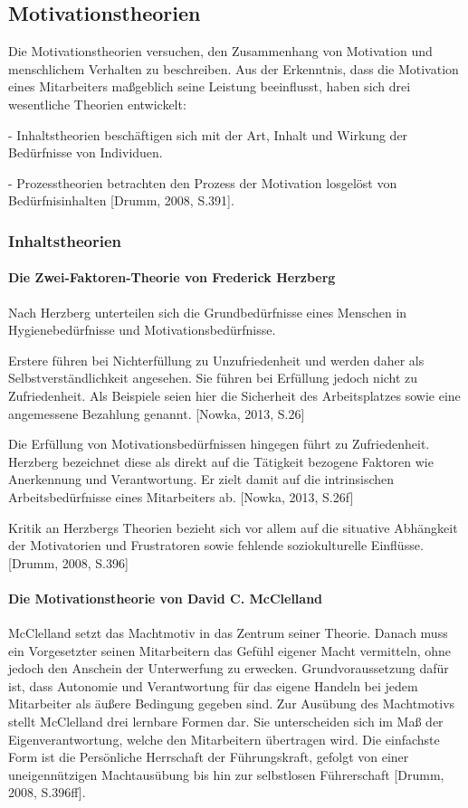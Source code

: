 \subsection{Motivationstheorien}
Die Motivationstheorien versuchen, den Zusammenhang von Motivation und menschlichem Verhalten zu beschreiben. Aus der Erkenntnis, dass die Motivation eines Mitarbeiters maßgeblich seine Leistung beeinflusst, haben sich drei wesentliche Theorien entwickelt:

- Inhaltstheorien beschäftigen sich mit \glqq der Art, Inhalt und Wirkung der Bedürfnisse von Individuen\grqq [Drumm, 2008, S.391].

- Prozesstheorien betrachten den Prozess der Motivation losgelöst von Bedürfnisinhalten [Drumm, 2008, S.391].

\subsubsection{Inhaltstheorien}
\paragraph{Die Zwei-Faktoren-Theorie von Frederick Herzberg}
Nach Herzberg unterteilen sich die Grundbedürfnisse eines Menschen in Hygienebedürfnisse und  Motivationsbedürfnisse.

Erstere führen bei Nichterfüllung zu Unzufriedenheit und werden daher als Selbstverständlichkeit angesehen. Sie führen bei Erfüllung jedoch nicht zu Zufriedenheit. Als Beispiele seien hier die Sicherheit des Arbeitsplatzes sowie eine angemessene Bezahlung genannt. [Nowka, 2013, S.26]

Die Erfüllung von Motivationsbedürfnissen hingegen führt zu Zufriedenheit. Herzberg bezeichnet diese als direkt auf die Tätigkeit bezogene Faktoren wie Anerkennung und Verantwortung. Er zielt damit auf die intrinsischen Arbeitsbedürfnisse eines Mitarbeiters ab. [Nowka, 2013, S.26f]

Kritik an Herzbergs Theorien bezieht sich vor allem auf die situative Abhängkeit der Motivatorien und Frustratoren sowie fehlende soziokulturelle Einflüsse. [Drumm, 2008, S.396]

\paragraph{Die Motivationstheorie von David C. McClelland}
McClelland setzt das Machtmotiv in das Zentrum seiner Theorie. Danach muss ein Vorgesetzter seinen Mitarbeitern das Gefühl eigener Macht vermitteln, ohne jedoch den Anschein der Unterwerfung zu erwecken. Grundvoraussetzung dafür ist, dass Autonomie und Verantwortung für das eigene Handeln bei jedem Mitarbeiter als äußere Bedingung gegeben sind. 
Zur Ausübung des Machtmotivs stellt McClelland drei lernbare Formen dar. Sie unterscheiden sich im Maß der Eigenverantwortung, welche den Mitarbeitern übertragen wird. Die einfachste Form ist die Persönliche Herrschaft der Führungskraft, gefolgt von einer uneigennützigen Machtausübung bis hin zur selbstlosen Führerschaft [Drumm, 2008, S.396ff].


